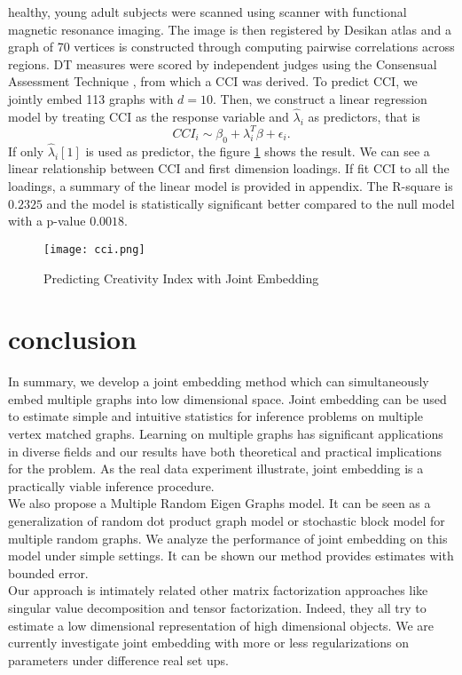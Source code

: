 \documentclass[10pt,journal,compsoc]{IEEEtran}
\begin{document}
 healthy, young adult subjects were scanned using  scanner with functional magnetic resonance imaging. The image is then registered by Desikan atlas \cite{desikan2006automated} and a graph of 70 vertices is constructed through computing pairwise correlations across regions. DT measures were scored by  independent judges using the Consensual Assessment Technique \cite{amabile1983social}, from which a CCI was derived. To predict CCI, we jointly embed 113 graphs with $d=10$. Then, we construct a linear regression model by treating CCI as the response variable and $\hat{\lambda}_i$ as predictors, that is
\[CCI_i \sim \beta_0+\lambda_i^T\beta + \epsilon_i. \]
If only $\hat{\lambda}_i[1]$ is used as predictor, the figure \ref{fig:cci} shows the result. We can see a linear relationship between CCI and first dimension loadings. If fit CCI to all the loadings, a summary of the linear model is provided in appendix. The R-square is $0.2325$ and the model is statistically significant better compared to the null model with a p-value $0.0018$. 
\begin{figure}[!htbp]
	\centering
	\texttt{[image: cci.png]}
	\caption{Predicting Creativity Index with Joint Embedding}
	\label{fig:cci}
\end{figure}



\section{conclusion}
In summary, we develop a joint embedding method which can simultaneously embed multiple graphs into low dimensional space. Joint embedding can
be used to estimate simple and intuitive statistics for inference problems on multiple vertex matched graphs. Learning on multiple graphs has significant applications in diverse fields and our results have both theoretical and practical implications for the problem. As the real data experiment illustrate, joint embedding is a practically viable inference procedure. \\

\noindent We also propose a Multiple Random Eigen Graphs model. It can be seen as a generalization of random dot product graph model or stochastic block model for multiple random graphs. We analyze the performance of joint embedding on this model under simple settings. It can be shown our method provides estimates with bounded error. \\

\noindent Our approach is intimately related other matrix factorization approaches like singular value decomposition and tensor factorization. Indeed, they all try to estimate a low dimensional representation of high dimensional objects. We are currently investigate joint embedding with more or less regularizations on parameters under difference real set ups.  
\end{document}
